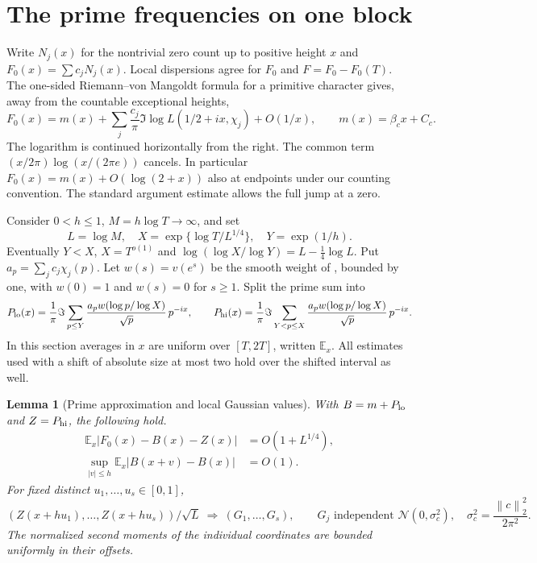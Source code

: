 \documentclass[11pt]{article}
\newtheorem{lemma}[theorem]{Lemma}
\newcommand{\E}{\mathbb E}
\newcommand{\norm}[1]{\left\lVert #1\right\rVert}
\begin{document}
\section{The prime frequencies on one block}
Write $N_j(x)$ for the nontrivial zero count up to positive height $x$ and
$F_0(x)=\sum c_jN_j(x)$. Local dispersions agree for $F_0$ and $F=F_0-F_0(T)$.
The one-sided Riemann--von Mangoldt formula for a primitive character gives, away from the countable exceptional heights,
\[
 F_0(x)=m(x)+\sum_j\frac{c_j}{\pi}\Im\log L(1/2+ix,\chi_j)+O(1/x),
 \qquad m(x)=\beta_c x+C_c .                                         \tag{3}
\]
The logarithm is continued horizontally from the right. The common term $(x/2\pi)\log(x/(2\pi e))$ cancels. In particular $F_0(x)=m(x)+O(\log(2+x))$ also at endpoints under our counting convention. The standard argument estimate allows the full jump at a zero.

Consider $0<h\le1$, $M=h\log T\to\infty$, and set
\[
 L=\log M,\quad X=\exp\{\log T/L^{1/4}\},\quad Y=\exp(1/h).
\]
Eventually $Y<X$, $X=T^{o(1)}$ and $\log(\log X/\log Y)=L-\tfrac14\log L$. Put $a_p=\sum_j c_j\chi_j(p)$.
Let $w(s)=v(e^s)$ be the smooth weight of \cite[\S2]{bp}, bounded by one, with $w(0)=1$ and $w(s)=0$ for $s\ge1$. Split the prime sum into
\[
 P_{\rm lo}(x)=\frac1\pi\Im\sum_{p\le Y}\frac{a_p w(\log p/\log X)}{\sqrt p}\,p^{-ix},
 \qquad
 P_{\rm hi}(x)=\frac1\pi\Im\sum_{Y<p\le X}\frac{a_p w(\log p/\log X)}{\sqrt p}\,p^{-ix}.
\]
In this section averages in $x$ are uniform over $[T,2T]$, written $\E_x$. All estimates used with a shift of absolute size at most two hold over the shifted interval as well.

\begin{lemma}[Prime approximation and local Gaussian values]\label{le:prime}
With $B=m+P_{\rm lo}$ and $Z=P_{\rm hi}$, the following hold.
\setcounter{equation}{3}
\begin{align}
 \E_x|F_0(x)-B(x)-Z(x)|&=O(1+L^{1/4}),\label{eq:err}\\
 \sup_{|v|\le h}\E_x|B(x+v)-B(x)|&=O(1).\label{eq:slow}
\end{align}
For fixed distinct $u_1,\ldots,u_s\in[0,1]$,
\[
 (Z(x+hu_1),\ldots,Z(x+hu_s))/\sqrt L
 \ \Longrightarrow\ (G_1,\ldots,G_s),\qquad
 G_j\text{ independent }\mathcal N(0,\sigma_c^2),\quad
 \sigma_c^2=\frac{\norm{c}_2^2}{2\pi^2}.
\]
The normalized second moments of the individual coordinates are bounded uniformly in their offsets.
\end{lemma}
\end{document}
